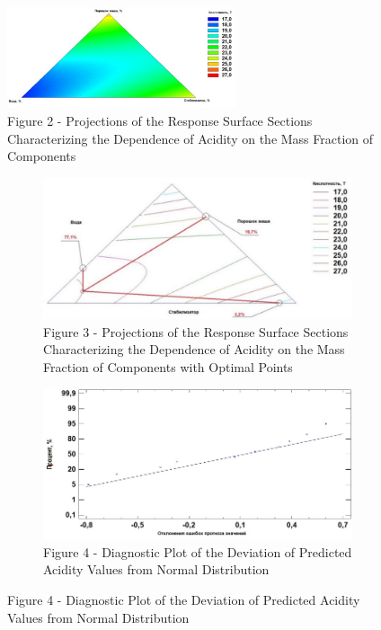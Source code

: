 \begin{figure}[H]
	\centering
	\includegraphics[width=0.6\textwidth]{media/pish/image6}
	\caption*{Figure 2 - Projections of the Response Surface Sections
Characterizing the Dependence of Acidity on the Mass Fraction of
Components}
\end{figure}

\begin{figure}[H]
    \centering
    \begin{subfigure}[t]{0.44\textwidth} %
        \centering
        \includegraphics[width=\textwidth]{media/pish/image7}
        \caption*{Figure 3 - Projections of the Response Surface Sections
Characterizing the Dependence of Acidity on the Mass Fraction of
Components with Optimal Points}
    \end{subfigure}
    \hspace{0.05\textwidth} %
    \begin{subfigure}[t]{0.44\textwidth} %
        \centering
        \includegraphics[width=\textwidth]{media/pish/image8}
        \caption*{Figure 4 - Diagnostic Plot of the Deviation of Predicted Acidity
Values from Normal Distribution}
    \end{subfigure}
\end{figure}

